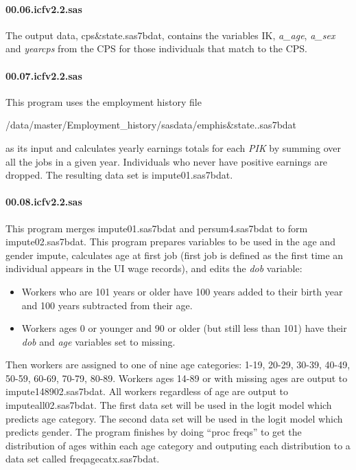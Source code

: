 \paragraph{00.06.icfv2.2.sas}

The output data, cps{\&}state.sas7bdat, contains the variables {IK}, \textit{%
a\_age}, \textit{a\_sex} and \textit{yearcps} from the CPS for those
individuals that match to the CPS.

\paragraph{00.07.icfv2.2.sas}

This program uses the employment history file

\begin{center}
/data/master/Employment\_history/sasdata/emphis{\&}state..sas7bdat
\end{center}

as its input  and calculates yearly earnings totals for each \textit{PIK} by
summing over all the jobs in a given year. Individuals who never have
positive earnings are dropped. The resulting data set is impute01.sas7bdat.

\paragraph{00.08.icfv2.2.sas}

This program merges impute01.sas7bdat and persum4.sas7bdat to form
impute02.sas7bdat. This program prepares variables to be used in the age and
gender impute, calculates age at first job (first job is defined as the
first time an individual appears in the UI wage records), and edits the 
\textit{dob} variable:

\begin{itemize}
\item Workers who are 101 years or older have 100 years added to their birth
year and 100 years subtracted from their age.

\item Workers ages 0 or younger and 90 or older (but still less than 101)
have their \textit{dob} and \textit{age} variables set to missing.
\end{itemize}

Then workers are assigned to one of nine age categories: 1-19, 20-29, 30-39,
40-49, 50-59, 60-69, 70-79, 80-89. Workers ages 14-89 or with missing ages
are output to impute148902.sas7bdat. All workers regardless of age are
output to imputeall02.sas7bdat. The first data set will be used in the logit
model which predicts age category. The second data set will be used in the
logit model which predicts gender. The program finishes by doing ``proc
freqs'' to get the distribution of ages within each age category and
outputing each distribution to a data set called freqagecatx.sas7bdat.

